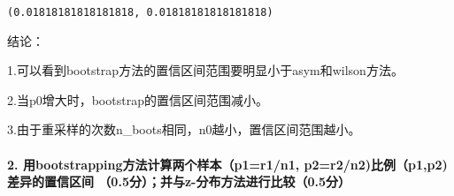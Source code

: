 \documentclass[11pt]{article}
\makeatletter
\newcommand{\boxspacing}{\kern\kvtcb@left@rule\kern\kvtcb@boxsep}
\newcommand{\prompt}[4]{
        \ttfamily\llap{{\color{#2}[#3]:\hspace{3pt}#4}}\vspace{-\baselineskip}
    }
\makeatother
\begin{document}
            \begin{tcolorbox}[breakable, size=fbox, boxrule=.5pt, pad at break*=1mm, opacityfill=0]
\prompt{Out}{outcolor}{21}{\boxspacing}
\begin{Verbatim}[commandchars=\\\{\}]
(0.01818181818181818, 0.01818181818181818)
\end{Verbatim}
\end{tcolorbox}
        
    结论： 
    
    1.可以看到bootstrap方法的置信区间范围要明显小于asym和wilson方法。 
    
    2.当p0增大时，bootstrap的置信区间范围减小。 
    
    3.由于重采样的次数n\_boots相同，n0越小，置信区间范围越小。

    \hypertarget{ux7528bootstrappingux65b9ux6cd5ux8ba1ux7b97ux4e24ux4e2aux6837ux672cp1r1n1-p2r2n2ux6bd4ux4f8bp1p2ux5deeux5f02ux7684ux7f6eux4fe1ux533aux95f4-0.5ux5206ux5e76ux4e0ez-ux5206ux5e03ux65b9ux6cd5ux8fdbux884cux6bd4ux8f830.5ux5206}{%
\paragraph{2. 用bootstrapping方法计算两个样本（p1=r1/n1,
p2=r2/n2)比例（p1,p2)差异的置信区间
（0.5分）；并与z-分布方法进行比较（0.5分）}\label{ux7528bootstrappingux65b9ux6cd5ux8ba1ux7b97ux4e24ux4e2aux6837ux672cp1r1n1-p2r2n2ux6bd4ux4f8bp1p2ux5deeux5f02ux7684ux7f6eux4fe1ux533aux95f4-0.5ux5206ux5e76ux4e0ez-ux5206ux5e03ux65b9ux6cd5ux8fdbux884cux6bd4ux8f830.5ux5206}}
\end{document}
